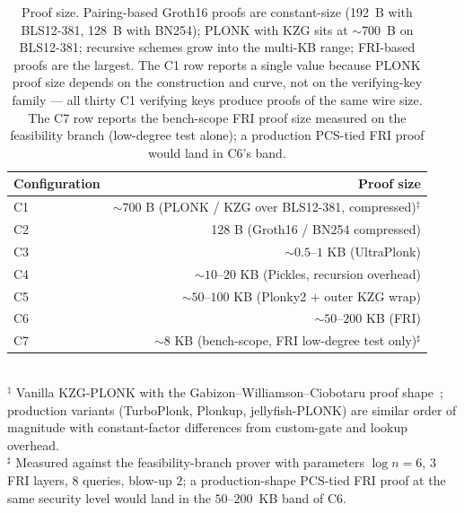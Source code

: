 \begin{table}[t]
  \centering
  \caption{Proof size. Pairing-based Groth16 proofs are constant-size
    (192~B with BLS12-381, 128~B with BN254); PLONK with KZG sits at
    $\sim$700~B on BLS12-381; recursive schemes grow into the
    multi-KB range; FRI-based proofs are the largest. The C1 row
    reports a single value because PLONK proof size depends on the
    construction and curve, not on the verifying-key family --- all
    thirty C1 verifying keys produce proofs of the same wire size.
    The C7 row reports the bench-scope FRI proof size measured on
    the feasibility branch (low-degree test alone); a production
    PCS-tied FRI proof would land in C6's band.}
  \label{tab:proof-size}
  \begin{tabular}{lr}
    \toprule
    Configuration & Proof size \\
    \midrule
    C1  & ${\sim}700$ B (PLONK / KZG over BLS12-381, compressed)$^{\ddagger}$ \\
    C2  & 128 B (Groth16 / BN254 compressed) \\
    C3  & ${\sim}0.5\text{--}1$ KB (UltraPlonk) \\
    C4  & ${\sim}10\text{--}20$ KB (Pickles, recursion overhead) \\
    C5  & ${\sim}50\text{--}100$ KB (Plonky2 + outer KZG wrap) \\
    C6  & ${\sim}50\text{--}200$ KB (FRI) \\
    C7  & ${\sim}8$ KB (bench-scope, FRI low-degree test only)$^{\sharp}$ \\
    \bottomrule
  \end{tabular}
  \\[0.5em]
  \footnotesize
  $^{\ddagger}$ Vanilla KZG-PLONK with the
  Gabizon--Williamson--Ciobotaru proof
  shape~\cite{gabizon-2019-plonk}; production variants
  (TurboPlonk, Plonkup, jellyfish-PLONK) are similar order of
  magnitude with constant-factor differences from custom-gate and
  lookup overhead.\\
  $^{\sharp}$ Measured against the feasibility-branch prover with
  parameters $\log n=6$, $3$ FRI layers, $8$ queries, blow-up $2$;
  a production-shape PCS-tied FRI proof at the same security level
  would land in the $50$--$200$~KB band of C6.
\end{table}
